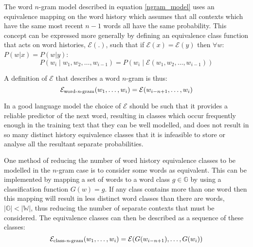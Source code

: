 The word $n$-gram model described in equation \ref{ngram_model} uses
an equivalence mapping on the word history which assumes that all
contexts which have the same most recent $n-1$ words all have the same
probability. This concept can be expressed more generally by defining
an equivalence class function that acts on word histories, $\mathcal
E(.)$, such that if $\mathcal E(x) = \mathcal E(y)$ then $\forall w:$
$P(w | x) = P(w | y)$:
\begin{equation}
P(w_i \;|\; w_1, w_2, \ldots, w_{i-1}) =
P(w_i \;|\; \mathcal E(w_1, w_2, \ldots, w_{i-1}))\label{equiv_cond_prob_model}
\end{equation}

A definition of $\mathcal{E}$ that describes a word $n$-gram is thus:
\begin{equation}
\mathcal E_{\textrm{word-{\it n}-gram}}(w_1, \ldots, w_{i}) = \mathcal E(w_{i-n+1}, \ldots, w_{i})
\end{equation}

In a good language model the choice of $\mathcal{E}$ should be such that it
provides a reliable predictor of the next word, resulting in classes
which occur frequently enough in the training text that they can be
well modelled, and does not result in so many distinct history
equivalence classes that it is infeasible to store or analyse all the
resultant separate probabilities.


\label{classngram-description}
One method of reducing the number of word history equivalence classes
to be modelled in the $n$-gram case is to consider some words as
equivalent. This can be implemented by mapping a set of words to a
word class $g \in \mathbb{G}$ by using a classification function $G(w)
= g$. If any class contains more than one word then this mapping will
result in less distinct word classes than there are words,
$|\mathbb{G}| < |\mathbb{W}|$, thus reducing the number of separate
contexts that must be considered. The equivalence classes can then be
described as a sequence of these classes:
\begin{equation}
\mathcal E_{\textrm{class-{\it n}-gram}}(w_1, \ldots, w_{i}) = \mathcal
E(G(w_{i-n+1}), \ldots, G(w_{i}))\label{equiv_classes}
\end{equation}

